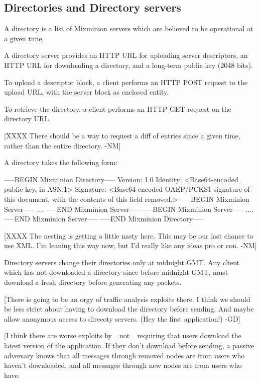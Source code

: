 \subsection{Directories and Directory servers}

A directory is a list of Mixminion servers which are believed to
be operational at a given time.

A directory server provides an HTTP URL for uploading server
descriptors, an HTTP URL for downloading a directory, and a long-term
public key (2048 bits).

To upload a descriptor block, a client performs an HTTP POST request
to the upload URL, with the server block as enclosed entity.

To retrieve the directory, a client performs an HTTP GET request on
the directory URL.

[XXXX There should be a way to request a diff of entries since a given
time, rather than the entire directory. -NM]

A directory takes the following form:

-----BEGIN Mixminion Directory-----
Version: 1.0
Identity: <Base64-encoded public key, in ASN.1>
Signature: <Base64-encoded OAEP/PCKS1 signature of this document, with
     the contents of this field removed.>
-----BEGIN Mixminion Server-----
 ....
-----END Mixminion Server-----
-----BEGIN Mixminion Server-----
 ....
-----END Mixminion Server-----
-----END Mixminion Directory-----

[XXXX The nesting is getting a little nasty here.  This may be our
   last chance to use XML.  I'm leaning this way now, but I'd
   really like any ideas pro or con. -NM]

Directory servers change their directories only at midnight GMT.  Any
client which has not downloaded a directory since before midnight GMT,
must download a fresh directory before generating any packets.

[There is going to be an orgy of traffic analysis exploits there. I
think we should be less strict about having to download the directory
before sending. And maybe allow anonymous access to direcoty
servers. (Hey the first application!) -GD]

[I think there are worse exploits by _not_ requiring that users
download the latest version of the application.  If they don't
download before sending, a passive adversary knows that all messages
through removed nodes are from users who haven't downloaded, and all
messages through new nodes are from users who have.  


